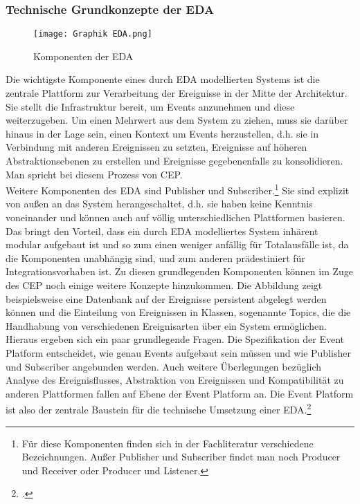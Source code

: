\subsubsection*{Technische Grundkonzepte der \ac{EDA}}
\begin{figure}[H]
  \centering
	\texttt{[image: Graphik EDA.png]}
   \caption[Komponenten der Event-Driven Architecture]{Komponenten der \ac{EDA}\footnotemark}
\end{figure}
Die wichtigste Komponente eines durch \ac{EDA} modellierten Systems ist die zentrale Plattform zur Verarbeitung der Ereignisse in der Mitte der Architektur. Sie stellt die Infrastruktur bereit, um Events anzunehmen und diese weiterzugeben. Um einen Mehrwert aus dem System zu ziehen, muss sie darüber hinaus in der Lage sein, einen Kontext um Events herzustellen, d.h. sie in Verbindung mit anderen Ereignissen zu setzten, Ereignisse auf höheren Abstraktionsebenen zu erstellen und Ereignisse gegebenenfalls zu konsolidieren. Man spricht bei diesem Prozess von 
\ac{CEP}.\\
Weitere Komponenten des \ac{EDA} sind Publisher und Subscriber.\footnote{Für diese Komponenten finden sich in der Fachliteratur verschiedene Bezeichnungen. Außer Publisher und Subscriber findet man noch Producer und Receiver oder Producer und Listener.} Sie sind explizit von außen an das System herangeschaltet, d.h. sie haben keine Kenntnis voneinander und können auch auf völlig unterschiedlichen Plattformen basieren. Das bringt den Vorteil, dass ein durch \ac{EDA} modelliertes System inhärent modular aufgebaut ist und so zum einen weniger anfällig für Totalausfälle ist, da die Komponenten unabhängig sind, und zum anderen prädestiniert für Integrationsvorhaben ist.
Zu diesen grundlegenden Komponenten können im Zuge des \ac{CEP} noch einige weitere Konzepte hinzukommen. Die Abbildung zeigt beispielsweise eine Datenbank auf der Ereignisse persistent abgelegt werden können und die Einteilung von Ereignissen in Klassen, sogenannte Topics, die die Handhabung von verschiedenen Ereignisarten über ein System ermöglichen.\\
Hieraus ergeben sich ein paar grundlegende Fragen. Die Spezifikation der Event Platform entscheidet, wie genau Events aufgebaut sein müssen und wie Publisher und Subscriber angebunden werden. Auch weitere Überlegungen bezüglich Analyse des Ereignisflusses, Abstraktion von Ereignissen und Kompatibilität zu anderen Plattformen fallen auf Ebene der Event Platform an. Die Event Platform ist also der zentrale Baustein für die technische Umsetzung einer \ac{EDA}.\footcite[Vgl. ][S. 244]{CLOUD2021}

